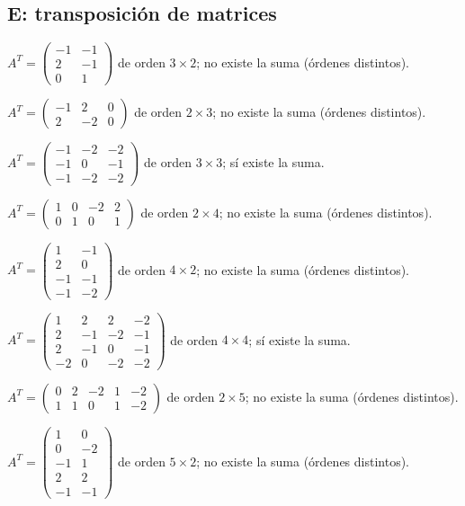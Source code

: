 \documentclass[12pt]{article}
\theoremstyle{remark}
\begin{document}
\subsection*{E: transposición de matrices}
\begin{description}[style=nextline,leftmargin=3em,itemsep=0.45em]
\item[E85.] $A^T=\begin{pmatrix}-1&-1\\2&-1\\0&1\end{pmatrix}$ de orden $3\times 2$; no existe la suma (órdenes distintos).
\item[E86.] $A^T=\begin{pmatrix}-1&2&0\\2&-2&0\end{pmatrix}$ de orden $2\times 3$; no existe la suma (órdenes distintos).
\item[E87.] $A^T=\begin{pmatrix}-1&-2&-2\\-1&0&-1\\-1&-2&-2\end{pmatrix}$ de orden $3\times 3$; sí existe la suma.
\item[E88.] $A^T=\begin{pmatrix}1&0&-2&2\\0&1&0&1\end{pmatrix}$ de orden $2\times 4$; no existe la suma (órdenes distintos).
\item[E89.] $A^T=\begin{pmatrix}1&-1\\2&0\\-1&-1\\-1&-2\end{pmatrix}$ de orden $4\times 2$; no existe la suma (órdenes distintos).
\item[E90.] $A^T=\begin{pmatrix}1&2&2&-2\\2&-1&-2&-1\\2&-1&0&-1\\-2&0&-2&-2\end{pmatrix}$ de orden $4\times 4$; sí existe la suma.
\item[E91.] $A^T=\begin{pmatrix}0&2&-2&1&-2\\1&1&0&1&-2\end{pmatrix}$ de orden $2\times 5$; no existe la suma (órdenes distintos).
\item[E92.] $A^T=\begin{pmatrix}1&0\\0&-2\\-1&1\\2&2\\-1&-1\end{pmatrix}$ de orden $5\times 2$; no existe la suma (órdenes distintos).

\end{description}
\end{document}
